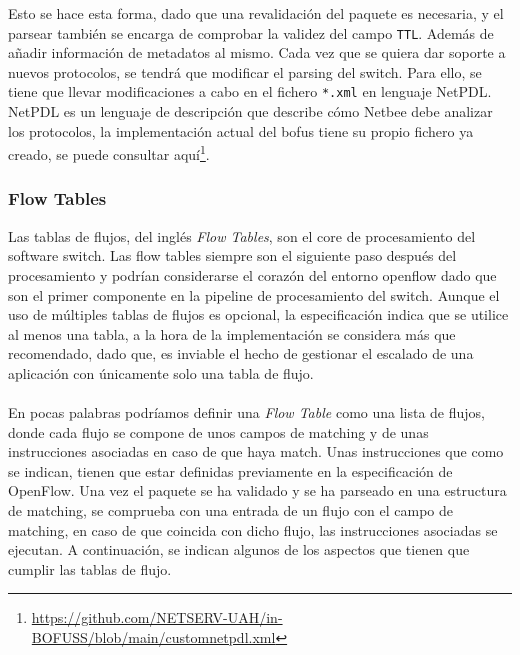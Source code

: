 Esto se hace esta forma, dado que una revalidación del paquete es necesaria, y el parsear también se encarga de comprobar la validez del campo \texttt{TTL}. Además de añadir información de metadatos al mismo. Cada vez que se quiera dar soporte a nuevos protocolos, se tendrá que modificar el parsing del switch. Para ello, se tiene que llevar modificaciones a cabo en el fichero \texttt{*.xml} en lenguaje NetPDL. NetPDL es un lenguaje de descripción que describe cómo Netbee debe analizar los protocolos, la implementación actual del \gls{bofus} tiene su propio fichero ya creado, se puede consultar aquí\footnote{\url{https://github.com/NETSERV-UAH/in-BOFUSS/blob/main/customnetpdl.xml}}.

\subsubsection{Flow Tables}

Las tablas de flujos, del inglés \textit{Flow Tables}, son el core de procesamiento del software switch. Las flow tables siempre son el siguiente paso después del procesamiento y podrían considerarse el corazón del entorno openflow dado que son el primer componente en la pipeline de procesamiento del switch. Aunque el uso de múltiples tablas de flujos es opcional, la especificación indica que se utilice al menos una tabla, a la hora de la implementación se considera más que recomendado, dado que, es inviable el hecho de gestionar el escalado de una aplicación con únicamente solo una tabla de flujo. \\
\\
En pocas palabras podríamos definir una  \textit{Flow Table} como una lista de flujos, donde cada flujo se compone de unos campos de matching y de unas instrucciones asociadas en caso de que haya match. Unas instrucciones que como se indican, tienen que estar definidas previamente en la especificación de OpenFlow. Una vez el paquete se ha validado y se ha parseado en una estructura de matching, se comprueba con una entrada de un flujo con el campo de matching, en caso de que coincida con dicho flujo, las instrucciones asociadas se ejecutan. A continuación, se indican algunos de los aspectos que tienen que cumplir las tablas de flujo.

